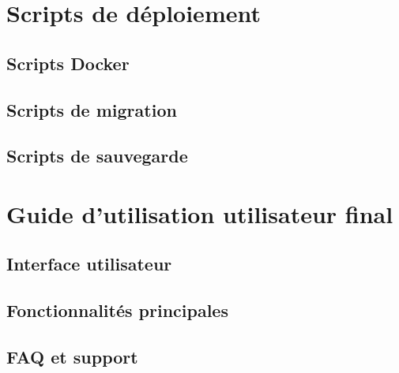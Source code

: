 \documentclass[12pt,a4paper]{report}
\begin{document}
\chapter{Scripts de déploiement}

\section{Scripts Docker}
\section{Scripts de migration}
\section{Scripts de sauvegarde}

\chapter{Guide d'utilisation utilisateur final}

\section{Interface utilisateur}
\section{Fonctionnalités principales}
\section{FAQ et support}
\end{document}
